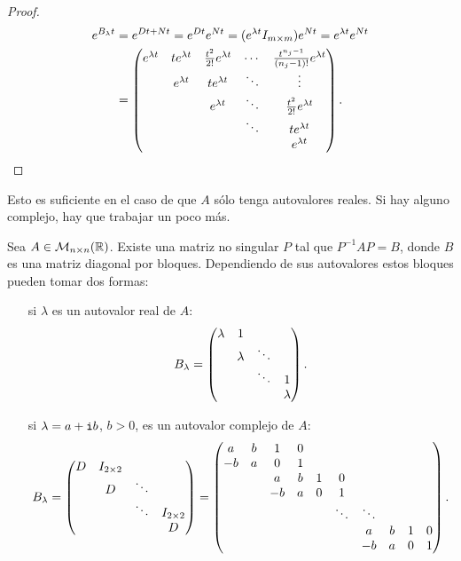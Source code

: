 \documentclass[../ecuaciones_diferenciales.tex]{subfiles}
\begin{document}
\begin{proof}
	\begin{align*}
		e^{B_\lambda t} &= e^{Dt + Nt} = e^{Dt} e^{Nt} 
			= (e^{\lambda t} I_{m \times m}) e^{Nt} = e^{\lambda t}e^{Nt} \\
			&= \begin{pmatrix}e^{\lambda t} & te^{\lambda t} & \frac{t^2}{2!}e^{\lambda t} & \cdots & \frac{t^{n_j-1}}{(n_j-1)!}e^{\lambda t} \\
				& e^{\lambda t} & te^{\lambda t}              & \ddots & \vdots                    \\
				&   & e^{\lambda t}              & \ddots & \frac{t^2}{2!}e^{\lambda t}            \\
				&   &                & \ddots & te^{\lambda t}                         \\
				&   &                &        & e^{\lambda t} \end{pmatrix}.
	\end{align*}
\end{proof}

Esto es suficiente en el caso de que \(A\) sólo tenga autovalores reales. Si
hay alguno complejo, hay que trabajar un poco más.

\begin{theorem}
	Sea \(A \in \mathcal{M}_{n \times n}(\mathbb{R})\). Existe una matriz no singular
	\(P\) tal que \(P^{-1}AP = B\), donde \(B\) es una matriz diagonal por
	bloques. Dependiendo de sus autovalores estos bloques pueden tomar dos
	formas:
	\begin{enumerate}[align=left]
		\item[si \(\lambda\) es un autovalor real de \(A\):] 
			\[B_\lambda = \begin{pmatrix}\lambda & 1 & & \\ & \lambda & \ddots & \\ & & \ddots & 1 \\ & & & \lambda\end{pmatrix}.\]

		\item[si \(\lambda = a + \mathtt{i} b\), \(b > 0\),
			es un autovalor complejo de \(A\):]
			\[B_\lambda = 
				\begin{pmatrix}D & I_{2 \times 2} & & \\ & D & \ddots & \\ & & \ddots &
				I_{2 \times 2} \\ & & & D\end{pmatrix}
				= \begin{pmatrix}a & b & 1 & 0 \\ -b & a & 0 & 1 
					\\ && a & b & 1 & 0 \\ && -b & a & 0 & 1
					\\ &&&&& \ddots & \ddots 
					 \\ &&&&&& a & b & 1 & 0 \\ &&&&&& -b & a & 0 & 1\end{pmatrix}.\]
	\end{enumerate}
\end{theorem}
\end{document}
